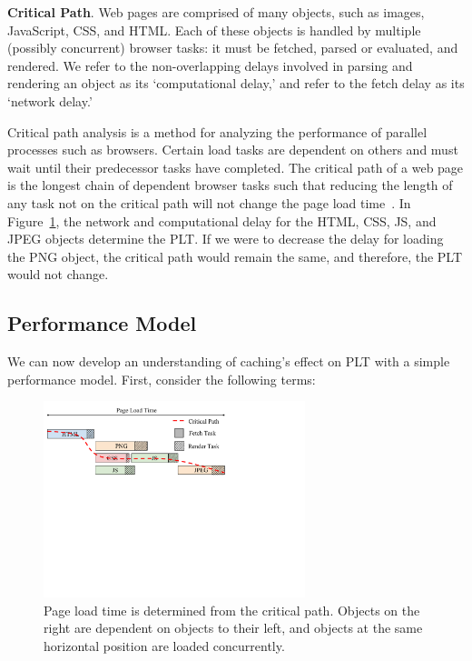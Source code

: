 \textbf{Critical Path}. Web pages are comprised of many objects, such as images, JavaScript, CSS, and HTML.
Each of these objects is handled by multiple (possibly concurrent) browser tasks: it must be
fetched, parsed or evaluated, and rendered. We refer to the non-overlapping
delays involved in parsing and rendering an object as its `computational
delay,' and refer to the fetch delay as its `network delay.'

Critical path analysis is a method for analyzing the performance of parallel
processes such as browsers.
Certain load tasks are dependent on others and must wait until their
predecessor tasks have completed. The critical path of a web page is the longest chain of dependent browser tasks such that reducing the length of any task not on the critical
path will not change the page load time~\cite{sarkar1987partitioning}.
In Figure~\ref{fig:plt-diagram}, the network and computational delay for the HTML, CSS, JS, and JPEG
objects determine the PLT. If we were to decrease the delay for loading the
PNG object, the critical path would remain the same, and therefore, the PLT would not change.


\subsection{Performance Model}
\label{subsec:model}
We can now develop an understanding of caching's effect on PLT with a simple performance model.
First, consider the following terms:
\begin{figure}[t]
    \hspace{-10pt}
    \includegraphics[width=3in]{../images/plt-diagram.pdf}
    \caption[]{\label{fig:plt-diagram} Page load time is determined from the critical path. Objects on the right are dependent on objects to their left, and objects at the same horizontal position are loaded concurrently.}
\end{figure}


